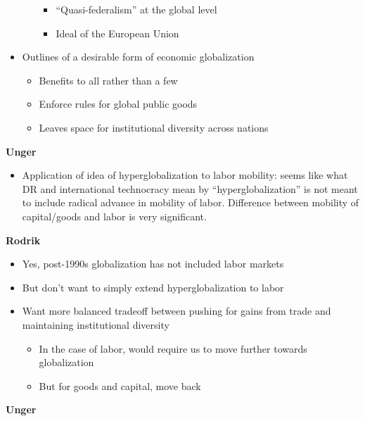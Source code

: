 \begin{itemize}
\begin{itemize}
    \begin{itemize}
    \tightlist
    \item
      ``Quasi-federalism'' at the global level
    \item
      Ideal of the European Union
    \end{itemize}
  \end{itemize}
\item
  Outlines of a desirable form of economic globalization

  \begin{itemize}
  \tightlist
  \item
    Benefits to all rather than a few
  \item
    Enforce rules for global public goods
  \item
    Leaves space for institutional diversity across nations
  \end{itemize}
\end{itemize}

\textbf{Unger}

\begin{itemize}
\tightlist
\item
  Application of idea of hyperglobalization to labor mobility: seems
  like what DR and international technocracy mean by
  ``hyperglobalization'' is not meant to include radical advance in
  mobility of labor. Difference between mobility of capital/goods and
  labor is very significant.
\end{itemize}

\textbf{Rodrik}

\begin{itemize}
\tightlist
\item
  Yes, post-1990s globalization has not included labor markets
\item
  But don't want to simply extend hyperglobalization to labor
\item
  Want more balanced tradeoff between pushing for gains from trade and
  maintaining institutional diversity

  \begin{itemize}
  \tightlist
  \item
    In the case of labor, would require us to move further towards
    globalization
  \item
    But for goods and capital, move back
  \end{itemize}
\end{itemize}

\textbf{Unger}

